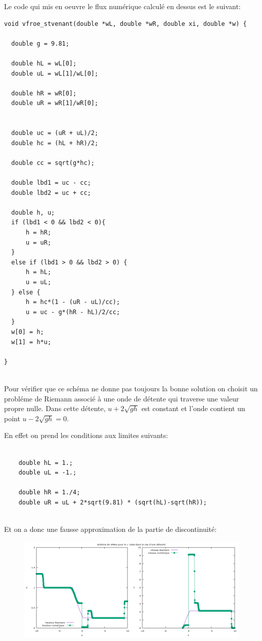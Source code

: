 Le code qui mis en oeuvre le flux num\'erique calcul\'e en dessus est le suivant:

\begin{lstlisting}
void vfroe_stvenant(double *wL, double *wR, double xi, double *w) {

  double g = 9.81;

  double hL = wL[0];
  double uL = wL[1]/wL[0];

  double hR = wR[0];
  double uR = wR[1]/wR[0];


  double uc = (uR + uL)/2;
  double hc = (hL + hR)/2;

  double cc = sqrt(g*hc);

  double lbd1 = uc - cc;
  double lbd2 = uc + cc;

  double h, u;
  if (lbd1 < 0 && lbd2 < 0){
      h = hR;
      u = uR;
  }
  else if (lbd1 > 0 && lbd2 > 0) {
      h = hL;
      u = uL;
  } else {
      h = hc*(1 - (uR - uL)/cc);
      u = uc - g*(hR - hL)/2/cc;
  }
  w[0] = h;
  w[1] = h*u;

}
        
\end{lstlisting}

Pour v\'erifier que ce sch\'ema ne donne pas toujours la bonne solution on choisit un probl\'eme de Riemann associ\'e \`a une onde de d\'etente qui traverse une valeur propre nulle. Dans cette d\'etente, $u+ 2\sqrt {gh}$ est constant et l’onde contient un point $u-2\sqrt {gh} = 0$.

En effet on prend les conditions aux limites suivants:

\begin{lstlisting}

    double hL = 1.;
    double uL = -1.;

    double hR = 1./4;
    double uR = uL + 2*sqrt(9.81) * (sqrt(hL)-sqrt(hR));
    
\end{lstlisting}

Et on a donc une fausse approximation de la partie de discontinuit\'e:

\begin{figure}[h!]
	\centering \includegraphics[scale=0.5]{Images_Fichiers/vfroe1.png}

\end{figure}

